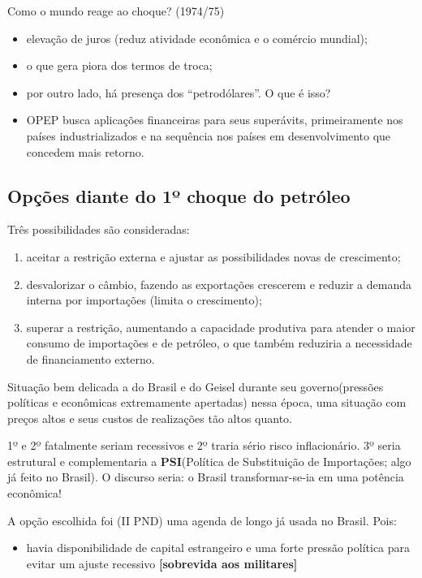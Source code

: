 \documentclass[a4paper,12pt]{article}[abntex2]
\begin{document}
Como o mundo reage ao choque? (1974/75)\begin{itemize}
    \item elevação de juros (reduz atividade econômica e o comércio mundial); 
    \item o que gera piora dos termos de troca;
    \item por outro lado, há presença dos “petrodólares”. O que é isso?
    \item OPEP busca aplicações financeiras para seus superávits, primeiramente nos países industrializados e na sequência nos países em desenvolvimento que concedem mais retorno.
\end{itemize}

\subsection{\textbf{Opções diante do 1º choque do petróleo}}
Três possibilidades são consideradas:\begin{enumerate}
    \item aceitar a restrição externa e ajustar as possibilidades novas de crescimento;
    \item desvalorizar o câmbio, fazendo as exportações crescerem e reduzir a demanda interna por importações (limita o crescimento);
    \item superar a restrição, aumentando a capacidade produtiva para atender o maior consumo de importações e de petróleo, o que também reduziria a necessidade de financiamento externo.
\end{enumerate}

Situação bem delicada a do Brasil e do Geisel durante seu governo(pressões políticas e econômicas extremamente apertadas) nessa época, uma situação com preços altos e seus custos de realizações tão altos quanto.

1º e 2º fatalmente seriam recessivos e 2º traria sério risco inflacionário. 3º seria estrutural e complementaria a \textbf{PSI}(Política de Substituição de Importações; algo já feito no Brasil). O discurso seria: o Brasil transformar-se-ia em uma potência econômica!

A opção escolhida foi (II PND) uma agenda de longo já usada no Brasil. Pois:\begin{itemize}
    \item havia disponibilidade de capital estrangeiro e uma forte pressão política para evitar um ajuste recessivo \textbf{[sobrevida aos militares]}
\end{itemize}
\end{document}

